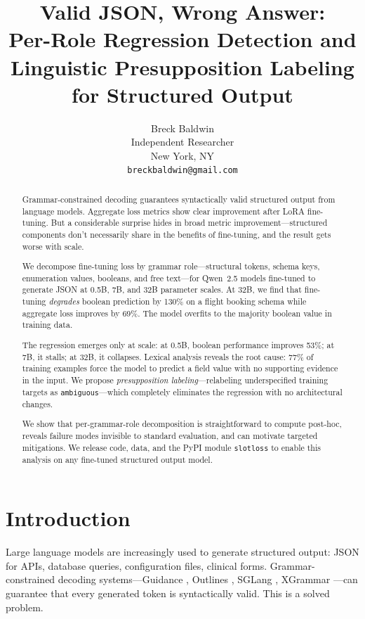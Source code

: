 \documentclass[11pt]{article}
\title{Valid JSON, Wrong Answer:\\Per-Role Regression Detection and\\Linguistic Presupposition Labeling for Structured Output}
\author{Breck Baldwin \\
  Independent Researcher \\
  New York, NY \\
  \texttt{breckbaldwin@gmail.com}}
\begin{document}
\maketitle

\begin{abstract}
Grammar-constrained decoding guarantees syntactically valid structured output from language models. Aggregate loss metrics show clear improvement after LoRA fine-tuning. But a considerable surprise hides in broad metric improvement---structured components don't necessarily share in the benefits of fine-tuning, and the result gets worse with scale.

We decompose fine-tuning loss by grammar role---structural tokens, schema keys, enumeration values, booleans, and free text---for Qwen~2.5 models fine-tuned to generate JSON at 0.5B, 7B, and 32B parameter scales. At 32B, we find that fine-tuning \emph{degrades} boolean prediction by 130\% on a flight booking schema while aggregate loss improves by 69\%. The model overfits to the majority boolean value in training data.

The regression emerges only at scale: at 0.5B, boolean performance improves 53\%; at 7B, it stalls; at 32B, it collapses. Lexical analysis reveals the root cause: 77\% of training examples force the model to predict a field value with no supporting evidence in the input. We propose \emph{presupposition labeling}---relabeling underspecified training targets as \texttt{ambiguous}---which completely eliminates the regression with no architectural changes.

We show that per-grammar-role decomposition is straightforward to compute post-hoc, reveals failure modes invisible to standard evaluation, and can motivate targeted mitigations. We release code, data, and the PyPI module \texttt{slotloss} to enable this analysis on any fine-tuned structured output model.
\end{abstract}

\section{Introduction}

Large language models are increasingly used to generate structured output: JSON for APIs, database queries, configuration files, clinical forms. Grammar-constrained decoding systems---Guidance \cite{guidance2024}, Outlines \cite{willard2023outlines}, SGLang \cite{zheng2024sglang}, XGrammar \cite{xgrammar2024}---can guarantee that every generated token is syntactically valid. This is a solved problem.
\end{document}
